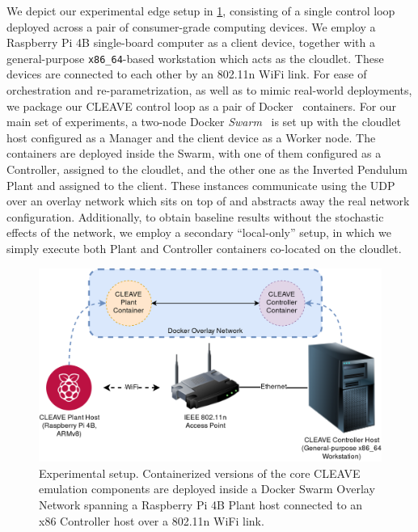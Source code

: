 We depict our experimental edge setup in \cref{fig:cleave:expsetup}, consisting of a single control loop deployed across a pair of consumer-grade computing devices.
We employ a Raspberry Pi 4B single-board computer as a client device, together with a general-purpose \verb|x86_64|-based workstation which acts as the cloudlet.
These devices are connected to each other by an 802.11n WiFi link.
For ease of orchestration and re-parametrization, as well as to mimic real-world deployments, we package our CLEAVE control loop as a pair of Docker~\cite{merkel2014docker} containers.
For our main set of experiments, a two-node Docker \emph{Swarm}~\cite{Swarm2021} is set up with the cloudlet host configured as a Manager and the client device as a Worker node.
The containers are deployed inside the Swarm, with one of them configured as a Controller, assigned to the cloudlet, and the other one as the Inverted Pendulum Plant and assigned to the client.
These instances communicate using the \ac{UDP} over an overlay network which sits on top of and abstracts away the real network configuration.
Additionally, to obtain baseline results without the stochastic effects of the network, we employ a secondary ``local-only'' setup, in which we simply execute both Plant and Controller containers co-located on the cloudlet.

\begin{figure}
    \centering
    \includegraphics[width=.95\columnwidth]{images/CLEAVE_experiment_setup}
    \caption{Experimental setup. Containerized versions of the core CLEAVE emulation components are deployed inside a Docker Swarm Overlay Network spanning a Raspberry Pi 4B Plant host connected to an x86 Controller host over a 802.11n WiFi link.}\label{fig:cleave:expsetup}
\end{figure}

